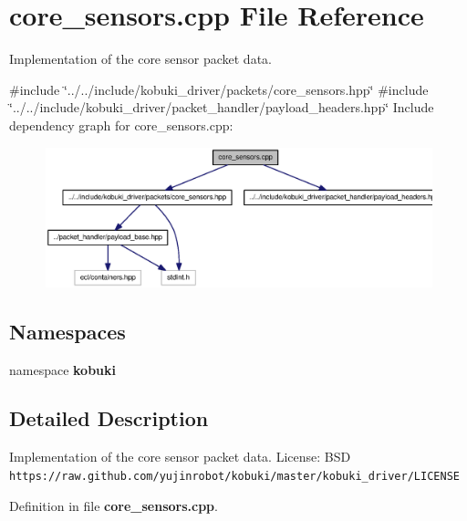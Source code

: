 \section{core\-\_\-sensors.\-cpp \-File \-Reference}
\label{core__sensors_8cpp}


\-Implementation of the core sensor packet data.  


{\ttfamily \#include \char`\"{}../../include/kobuki\-\_\-driver/packets/core\-\_\-sensors.\-hpp\char`\"{}}\*
{\ttfamily \#include \char`\"{}../../include/kobuki\-\_\-driver/packet\-\_\-handler/payload\-\_\-headers.\-hpp\char`\"{}}\*
\-Include dependency graph for core\-\_\-sensors.\-cpp\-:
\nopagebreak
\begin{figure}[H]
\begin{center}
\leavevmode
\includegraphics[width=350pt]{core__sensors_8cpp__incl}
\end{center}
\end{figure}
\subsection*{\-Namespaces}
\begin{DoxyCompactItemize}
\item 
namespace {\bf kobuki}
\end{DoxyCompactItemize}


\subsection{\-Detailed \-Description}
\-Implementation of the core sensor packet data. \-License\-: \-B\-S\-D {\tt https\-://raw.\-github.\-com/yujinrobot/kobuki/master/kobuki\-\_\-driver/\-L\-I\-C\-E\-N\-S\-E} 

\-Definition in file {\bf core\-\_\-sensors.\-cpp}.

